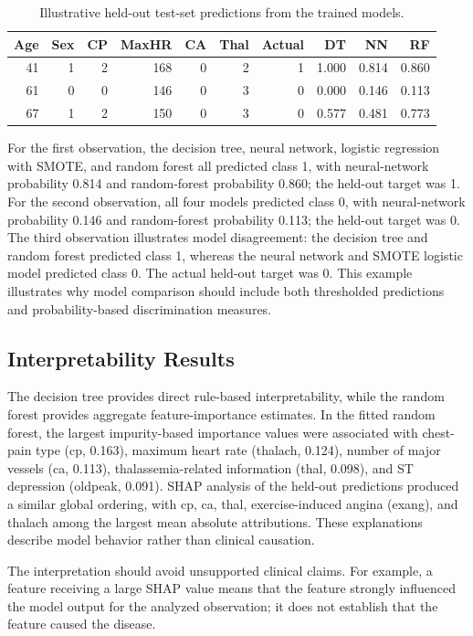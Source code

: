 \documentclass[10pt]{article}
\begin{document}
\begin{table}[t]
\caption{Illustrative held-out test-set predictions from the trained models.}
\label{tab:samples}
\centering
\small
\begin{tabular}{rrrrrrrrrr}
\toprule
Age & Sex & CP & MaxHR & CA & Thal & Actual & DT & NN & RF \\
\midrule
41 & 1 & 2 & 168 & 0 & 2 & 1 & 1.000 & 0.814 & 0.860 \\
61 & 0 & 0 & 146 & 0 & 3 & 0 & 0.000 & 0.146 & 0.113 \\
67 & 1 & 2 & 150 & 0 & 3 & 0 & 0.577 & 0.481 & 0.773 \\
\bottomrule
\end{tabular}
\end{table}

For the first observation, the decision tree, neural network, logistic regression with SMOTE, and random forest all predicted class 1, with neural-network probability 0.814 and random-forest probability 0.860; the held-out target was 1. For the second observation, all four models predicted class 0, with neural-network probability 0.146 and random-forest probability 0.113; the held-out target was 0. The third observation illustrates model disagreement: the decision tree and random forest predicted class 1, whereas the neural network and SMOTE logistic model predicted class 0. The actual held-out target was 0. This example illustrates why model comparison should include both thresholded predictions and probability-based discrimination measures.

\subsection{Interpretability Results}
The decision tree provides direct rule-based interpretability, while the random forest provides aggregate feature-importance estimates. In the fitted random forest, the largest impurity-based importance values were associated with chest-pain type (cp, 0.163), maximum heart rate (thalach, 0.124), number of major vessels (ca, 0.113), thalassemia-related information (thal, 0.098), and ST depression (oldpeak, 0.091). SHAP analysis of the held-out predictions produced a similar global ordering, with cp, ca, thal, exercise-induced angina (exang), and thalach among the largest mean absolute attributions. These explanations describe model behavior rather than clinical causation.

The interpretation should avoid unsupported clinical claims. For example, a feature receiving a large SHAP value means that the feature strongly influenced the model output for the analyzed observation; it does not establish that the feature caused the disease.
\end{document}
